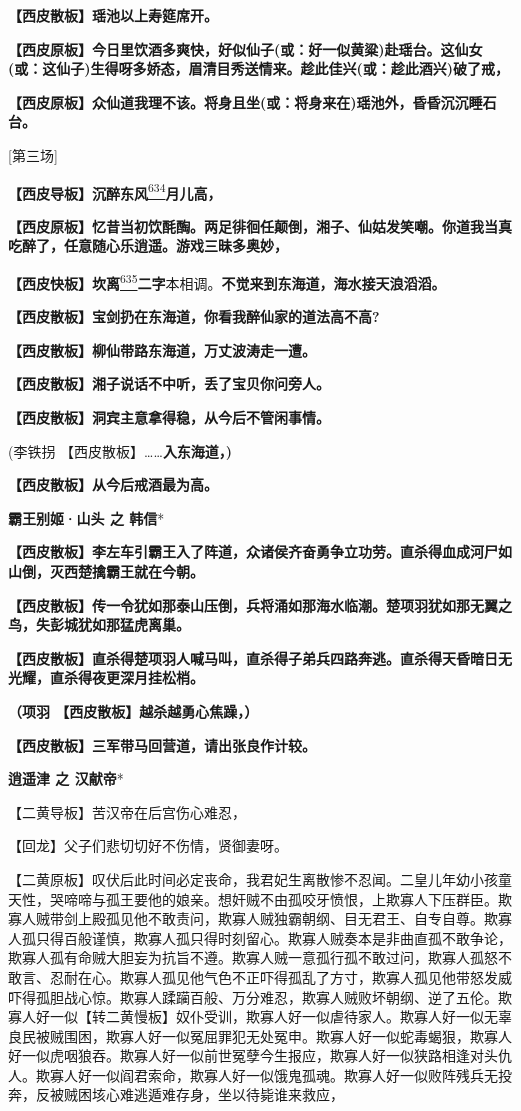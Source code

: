 \textbf{【西皮散板】瑶池以上寿筵席开。}

\textbf{【西皮原板】今日里饮酒多爽快，好似仙子(或：好一似黄粱)赴瑶台。这仙女(或：这仙子)生得呀多娇态，眉清目秀送情来。趁此佳兴(或：趁此酒兴)破了戒，}

\textbf{【西皮原板】众仙道我理不该。将身且坐(或：将身来在)瑶池外，昏昏沉沉睡石台。}

{[}第三场{]}

\textbf{【西皮导板】沉醉东风}\protect\hyperlink{fn634}{\textsuperscript{634}}\textbf{月儿高，}

\textbf{【西皮原板】忆昔当初饮酕醄。两足徘徊任颠倒，湘子、仙姑发笑嘲。你道我当真吃醉了，任意随心乐逍遥。游戏三昧多奥妙，}

\textbf{【西皮快板】坎离}\protect\hyperlink{fn635}{\textsuperscript{635}}\textbf{二字}本相调。\textbf{不觉来到东海道，海水接天浪滔滔。}

\textbf{【西皮散板】宝剑扔在东海道，你看我醉仙家的道法高不高?}

\textbf{【西皮散板】柳仙带路东海道，万丈波涛走一遭。}

\textbf{【西皮散板】湘子说话不中听，丢了宝贝你问旁人。}

\textbf{【西皮散板】洞宾主意拿得稳，从今后不管闲事情。}

(李铁拐 【西皮散板】\ldots{}\ldots{}\textbf{入东海道，)}

\textbf{【西皮散板】从今后戒酒最为高。}

\newpage
\textbf{霸王别姬·山头 之 韩信}*

\textbf{【西皮散板】李左车引霸王入了阵道，众诸侯齐奋勇争立功劳。直杀得血成河尸如山倒，灭西楚擒霸王就在今朝。}

\textbf{【西皮散板】传一令犹如那泰山压倒，兵将涌如那海水临潮。楚项羽犹如那无翼之鸟，失彭城犹如那猛虎离巢。}

\textbf{【西皮散板】直杀得楚项羽人喊马叫，直杀得子弟兵四路奔逃。直杀得天昏暗日无光耀，直杀得夜更深月挂松梢。}

\textbf{（项羽 【西皮散板】越杀越勇心焦躁，）}

\textbf{【西皮散板】三军带马回营道，请出张良作计较。}

\newpage
\textbf{逍遥津 之 汉献帝}*

【二黄导板】苦汉帝在后宫伤心难忍，

【回龙】父子们悲切切好不伤情，贤御妻呀。

【二黄原板】叹伏后此时间必定丧命，我君妃生离散惨不忍闻。二皇儿年幼小孩童天性，哭啼啼与孤王要他的娘亲。想奸贼不由孤咬牙愤恨，上欺寡人下压群臣。欺寡人贼带剑上殿孤见他不敢责问，欺寡人贼独霸朝纲、目无君王、自专自尊。欺寡人孤只得百般谨慎，欺寡人孤只得时刻留心。欺寡人贼奏本是非曲直孤不敢争论，欺寡人孤有命贼大胆妄为抗旨不遵。欺寡人贼一意孤行孤不敢过问，欺寡人孤怒不敢言、忍耐在心。欺寡人孤见他气色不正吓得孤乱了方寸，欺寡人孤见他带怒发威吓得孤胆战心惊。欺寡人蹂躏百般、万分难忍，欺寡人贼败坏朝纲、逆了五伦。欺寡人好一似【转二黄慢板】奴仆受训，欺寡人好一似虐待家人。欺寡人好一似无辜良民被贼围困，欺寡人好一似冤屈罪犯无处冤申。欺寡人好一似蛇毒蝎狠，欺寡人好一似虎咽狼吞。欺寡人好一似前世冤孽今生报应，欺寡人好一似狭路相逢对头仇人。欺寡人好一似阎君索命，欺寡人好一似饿鬼孤魂。欺寡人好一似败阵残兵无投奔，反被贼困垓心难逃遁难存身，坐以待毙谁来救应，

